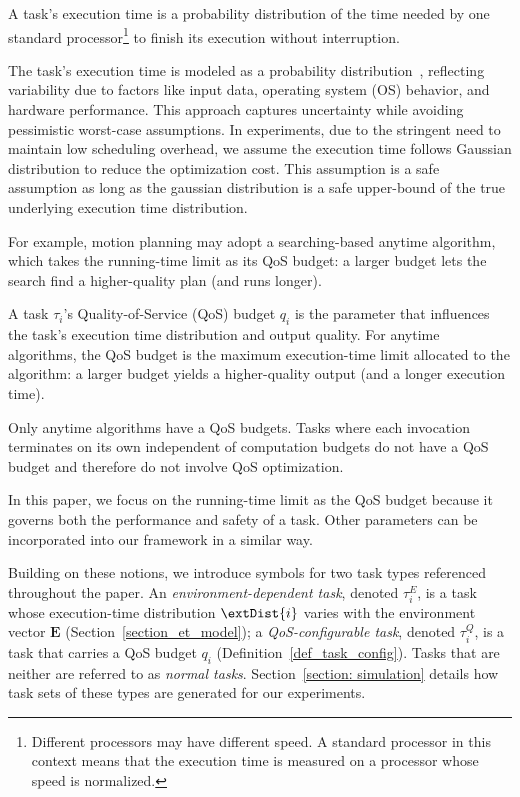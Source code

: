 	\begin{definition}
		A task's execution time is a probability distribution of the time needed by one standard processor\footnote{Different processors may have different speed. 
		A standard processor in this context means that the execution time is measured on a processor whose speed is normalized.} to finish its execution without interruption.
	\end{definition}

    The task's execution time is modeled as a probability distribution~\cite{Maxim2013ResponseTA}, reflecting variability due to factors like input data, operating system (OS) behavior, and hardware performance.
    This approach captures uncertainty while avoiding pessimistic worst-case assumptions.
    In experiments, due to the stringent need to maintain low scheduling overhead, we assume the execution time follows Gaussian distribution to reduce the optimization cost. 
	This assumption is a safe assumption as long as the gaussian distribution is a safe upper-bound of the true underlying execution time distribution.
	
	
	For example, motion planning may adopt a searching-based anytime algorithm, which takes the running-time limit as its QoS budget: a larger budget lets the search find a higher-quality plan (and runs longer).
	
	\begin{definition}
		\label{def_task_config}
		A task $\tau_i$'s Quality-of-Service (QoS) budget $q_i$ is the parameter that influences the task's execution time distribution and output quality.
		For anytime algorithms, the QoS budget is the maximum execution-time limit allocated to the algorithm: a larger budget yields a higher-quality output (and a longer execution time).
	\end{definition}
	Only anytime algorithms have a QoS budgets. Tasks where each invocation terminates on its own independent of computation budgets do not have a QoS budget and therefore do not involve QoS optimization.
	
	In this paper, we focus on the running-time limit as the QoS budget because it governs both the performance and safety of a task.
	Other parameters can be incorporated into our framework in a similar way.

	Building on these notions, we introduce symbols for two task types referenced throughout the paper.
	An \emph{environment-dependent task}, denoted $\tau^E_i$, is a task whose execution-time distribution $\extDist{i}$ varies with the environment vector $\textbf{E}$ (Section~\ref{section_et_model}); a \emph{QoS-configurable task}, denoted $\tau^Q_i$, is a task that carries a QoS budget $q_i$ (Definition~\ref{def_task_config}).
	Tasks that are neither are referred to as \emph{normal tasks}.
	Section~\ref{section: simulation} details how task sets of these types are generated for our experiments.
	
